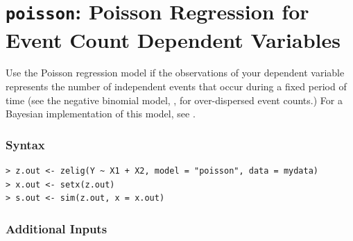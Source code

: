 \documentclass{article}
\begin{document}
\nobibliography*


\section{{\tt poisson}: Poisson Regression for Event Count
Dependent Variables}\label{poisson}

Use the Poisson regression model if the observations of your dependent
variable represents the number of independent events that occur during
a fixed period of time (see the negative binomial model, ,
for over-dispersed event counts.)  For a Bayesian implementation of
this model, see .  

\subsubsection{Syntax}

\begin{verbatim}
> z.out <- zelig(Y ~ X1 + X2, model = "poisson", data = mydata)
> x.out <- setx(z.out)
> s.out <- sim(z.out, x = x.out)
\end{verbatim}

\subsubsection{Additional Inputs} 
\end{document}

